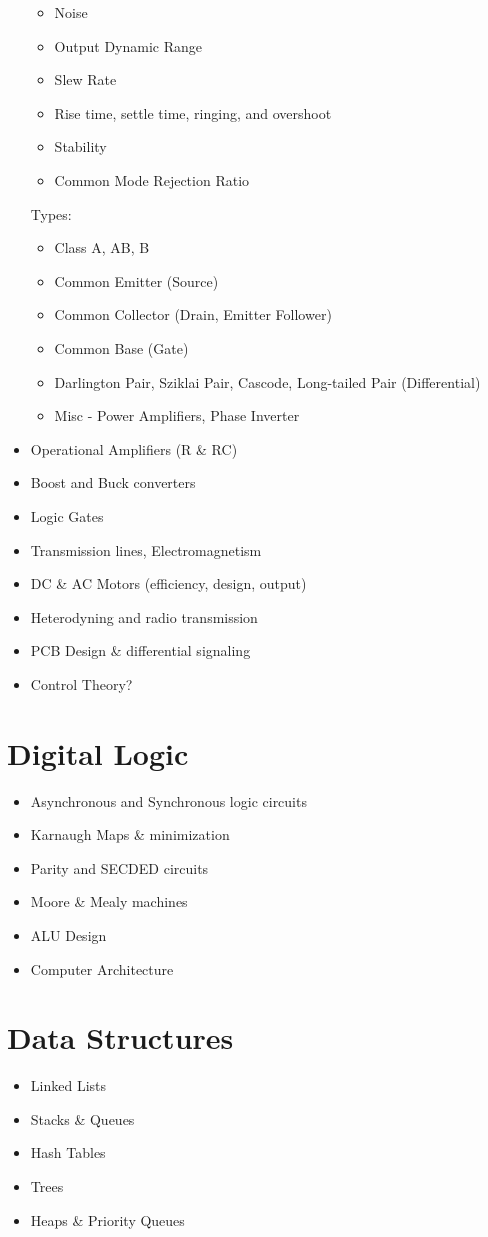 \documentclass[a4paper]{article}
\begin{document}
\begin{itemize}
\begin{itemize}
  \item Noise
  \item Output Dynamic Range
  \item Slew Rate
  \item Rise time, settle time, ringing, and overshoot
  \item Stability
  \item Common Mode Rejection Ratio
  \end{itemize}
  Types:
  \begin{itemize}
  \item Class A, AB, B
  \item Common Emitter (Source)
  \item Common Collector (Drain, Emitter Follower)
  \item Common Base (Gate)
  \item Darlington Pair, Sziklai Pair, Cascode, Long-tailed Pair (Differential)
  \item Misc - Power Amplifiers, Phase Inverter
  \end{itemize}
\item Operational Amplifiers (R \& RC)
\item Boost and Buck converters
\item Logic Gates
\item Transmission lines, Electromagnetism
\item DC \& AC Motors (efficiency, design, output)
\item Heterodyning and radio transmission
\item PCB Design \& differential signaling
\item Control Theory?
\end{itemize}

\section{Digital Logic}
\begin{itemize}
\item Asynchronous and Synchronous logic circuits
\item Karnaugh Maps \& minimization
\item Parity and SECDED circuits
\item Moore \& Mealy machines
\item ALU Design
\item Computer Architecture
\end{itemize}

\section{Data Structures}
\begin{itemize}
\item Linked Lists
\item Stacks \& Queues
\item Hash Tables
\item Trees
\item Heaps \& Priority Queues
\end{itemize}
\end{document}
